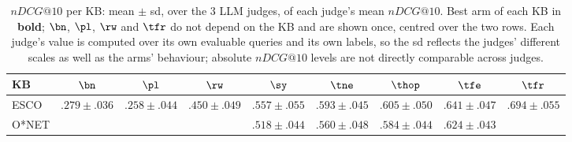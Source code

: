 \begin{table}
\centering\scriptsize
\caption{$nDCG@10$ per KB: mean $\pm$ sd, over the 3 LLM judges, of each judge's mean $nDCG@10$. Best arm of each KB in \textbf{bold}; $\bn$, $\pl$, $\rw$ and $\tfr$ do not depend on the KB and are shown once, centred over the two rows. Each judge's value is computed over its own evaluable queries and its own labels, so the sd reflects the judges' different scales as well as the arms' behaviour; absolute $nDCG@10$ levels are not directly comparable across judges.}
\label{tab:ndcg-avg}
\begin{tabular*}{\columnwidth}{@{\extracolsep{\fill}}lcccccccc}
\toprule
KB & $\bn$ & $\pl$ & $\rw$ & $\sy$ & $\tne$ & $\thop$ & $\tfe$ & $\tfr$ \\
\midrule
ESCO & \multirow{2}{*}{$.279 \pm .036$} & \multirow{2}{*}{$.258 \pm .044$} & \multirow{2}{*}{$.450 \pm .049$} & $.557 \pm .055$ & $.593 \pm .045$ & $.605 \pm .050$ & $.641 \pm .047$ & \multirow{2}{*}{$\mathbf{.694} \pm .055$} \\
O*NET &  &  &  & $.518 \pm .044$ & $.560 \pm .048$ & $.584 \pm .044$ & $.624 \pm .043$ &  \\
\bottomrule
\end{tabular*}
\end{table}
